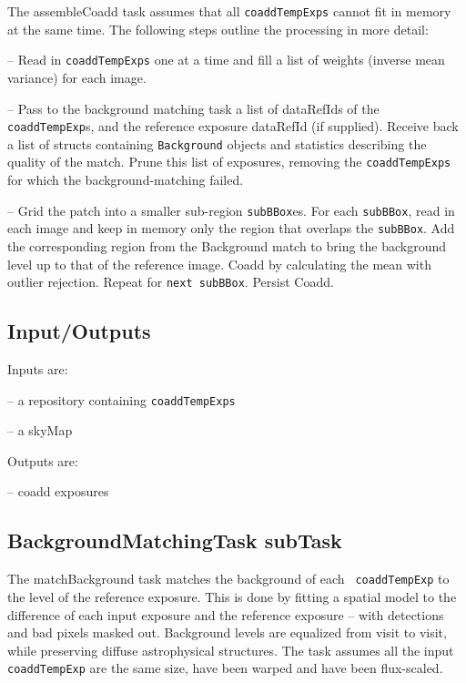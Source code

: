 \documentclass[prd, nofootinbib, floatfix, 11pt,tightenlines,times]{article}
\begin{document}
The assembleCoadd task assumes that all {\tt coaddTempExps} cannot fit
in memory at the same time. The following steps outline the processing
in more detail:

-- Read in {\tt coaddTempExps} one at a time and fill a list of
weights (inverse mean variance) for each image.

-- Pass to the background matching task a list of dataRefIds of the
{\tt coaddTempExp}s, and the reference exposure dataRefId (if
supplied).  Receive back a list of structs containing {\tt Background}
objects and statistics describing the quality of the match.  Prune
this list of exposures, removing the {\tt coaddTempExps} for which the
background-matching failed.  

-- Grid the patch into a smaller sub-region {\tt subBBox}es. For each
{\tt subBBox}, read in each image and keep in memory only the region
that overlaps the {\tt subBBox}. Add the corresponding region from the
Background match to bring the background level up to that of the
reference image.  Coadd by calculating the mean with outlier
rejection.  Repeat for {\tt next subBBox}.  Persist Coadd.



\subsection{Input/Outputs}

Inputs are: 

-- a repository containing {\tt coaddTempExps}

-- a skyMap

Outputs are: 

-- coadd exposures

\subsection{BackgroundMatchingTask subTask} 
The matchBackground task matches the background of each {\tt
  coaddTempExp} to the level of the reference exposure.  This is done
by fitting a spatial model to the difference of each input exposure
and the reference exposure -- with detections and bad pixels masked
out.  Background levels are equalized from visit to visit, while
preserving diffuse astrophysical structures.  The task assumes all the
input {\tt coaddTempExp} are the same size, have been warped and have
been flux-scaled.
\end{document}
